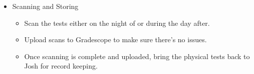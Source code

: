 \documentclass[11pt]{article}
\begin{document}
\begin{itemize}
\item Scanning and Storing
    \begin{itemize}
    \item Scan the tests either on the night of or during the day after.
    \item Upload scans to Gradescope to make sure there's no issues.
    \item Once scanning is complete and uploaded, bring the physical tests back to Josh for record keeping.
\end{itemize}
    
\end{itemize}
\end{document}
